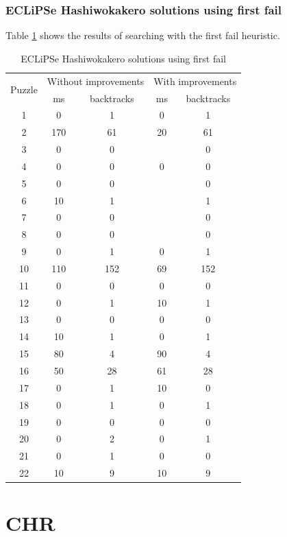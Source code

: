 \documentclass{report}
\begin{document}
\subsubsection{ECLiPSe Hashiwokakero solutions using first fail}
Table \ref{table:hashi-2} shows the results of searching with the first fail heuristic.
\begin{table}[h!]
\center
  \begin{tabular}{|c|c|c|c|c|}
    \hline
    \multirow{2}{*}{Puzzle} &
    \multicolumn{2}{L|}{Without improvements} &
    \multicolumn{2}{L|}{With improvements}\\
    & ms & backtracks & ms & backtracks \\
    \hline
        1 & 0 & 1 & 0 & 1 \\
        2 & 170 & 61 & 20 & 61 \\
        3 & 0 & 0 &  & 0 \\
        4 & 0 & 0 & 0 & 0 \\
        5 & 0 & 0 &  & 0 \\
        6 & 10 & 1 &  & 1 \\
        7 & 0 & 0 &  & 0 \\
        8 & 0 & 0 &  & 0 \\
        9 & 0 & 1 & 0 & 1 \\
        10 & 110 & 152 & 69 & 152 \\
        11 & 0 & 0 & 0 & 0 \\
        12 & 0 & 1 & 10 & 1 \\
        13 & 0 & 0 & 0 & 0 \\
        14 & 10 & 1 & 0 & 1 \\
        15 & 80 & 4 & 90 & 4 \\
        16 & 50 & 28 & 61 & 28 \\
        17 & 0 & 1 & 10 & 0 \\
        18 & 0 & 1 & 0 & 1 \\
        19 & 0 & 0 & 0 & 0 \\
        20 & 0 & 2 & 0 & 1 \\
        21 & 0 & 1 & 0 & 0 \\
        22 & 10 & 9 & 10 & 9 \\
    \hline
  \end{tabular}
  \caption{ECLiPSe Hashiwokakero solutions using first fail}
  \label{table:hashi-2}
\end{table}

\newpage
\newpage
\section{CHR}
\end{document}
